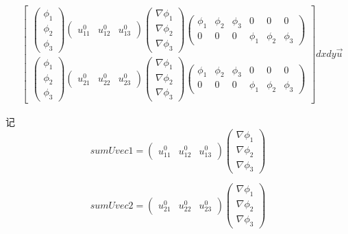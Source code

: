 \documentclass{ctexart}
\begin{document}
\begin{align*}
& \begin{bmatrix}
 \begin{pmatrix}
 \phi_1\\
 \phi_2\\
 \phi_3
\end{pmatrix}
\begin{pmatrix}
 u_{11}^0 &  u_{12}^0  & u_{13}^0 
\end{pmatrix}
\begin{pmatrix}
 \nabla \phi_1\\
 \nabla \phi_2\\
 \nabla \phi_3
\end{pmatrix}
\begin{pmatrix}
  \phi_1& \phi_2 & \phi_3 & 0 & 0 & 0\\
  0&  0&  0& \phi_1 & \phi_2 & \phi_3
\end{pmatrix}
\\
\begin{pmatrix}
 \phi_1\\
 \phi_2\\
 \phi_3
\end{pmatrix}
\begin{pmatrix}
 u_{21}^0 &  u_{22}^0  & u_{23}^0 
\end{pmatrix}
\begin{pmatrix}
 \nabla \phi_1\\
 \nabla \phi_2\\
 \nabla \phi_3
\end{pmatrix}
\begin{pmatrix}
  \phi_1& \phi_2 & \phi_3 & 0 & 0 & 0\\
  0&  0&  0& \phi_1 & \phi_2 & \phi_3
\end{pmatrix}
\end{bmatrix}dxdy\vec{u} 
\end{align*}

记
$$
sumUvec1 = \begin{pmatrix}
 u_{11}^0 &  u_{12}^0  & u_{13}^0 
\end{pmatrix}
\begin{pmatrix}
 \nabla \phi_1\\
 \nabla \phi_2\\
 \nabla \phi_3
\end{pmatrix}
$$

$$
sumUvec2 = \begin{pmatrix}
    u_{21}^0 &  u_{22}^0  & u_{23}^0 
   \end{pmatrix}
   \begin{pmatrix}
    \nabla \phi_1\\
    \nabla \phi_2\\
    \nabla \phi_3
   \end{pmatrix}
$$
\end{document}
